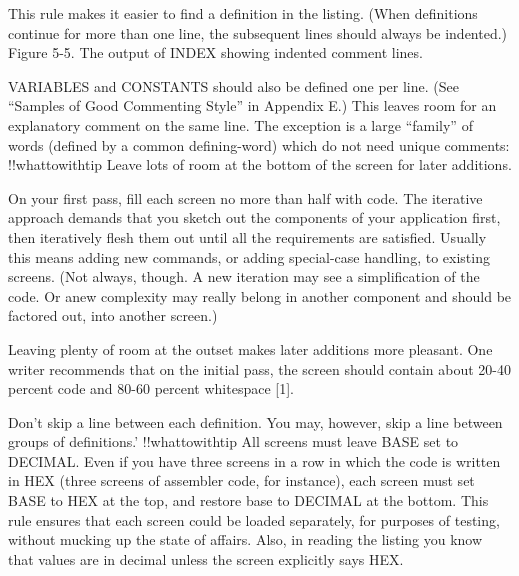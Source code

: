 This rule makes it easier to find a definition in the listing.  (When definitions
continue for more than one line, the subsequent lines should always
be indented.)
Figure 5-5. The output of INDEX showing indented comment lines.

VARIABLES and CONSTANTS should also be defined one per
line.  (See ``Samples of Good Commenting Style'' in Appendix E.) This
leaves room for an explanatory comment on the same line.  The exception
is a large ``family'' of words (defined by a common defining-word) which
do not need unique comments:
!!whattowithtip{
Leave lots of room at the bottom of the screen for later additions.
}

On your first pass, fill each screen no more than half with code.  The
iterative approach demands that you sketch out the components of your
application first, then iteratively flesh them out until all the requirements
are satisfied.  Usually this means adding new commands, or
adding special-case handling, to existing screens.  (Not always, though.  A
new iteration may see a simplification of the code.  Or anew complexity
may really belong in another component and should be factored out, into
another screen.)

Leaving plenty of room at the outset makes later additions more
pleasant.  One writer recommends that on the initial pass, the screen
should contain about 20-40 percent code and 80-60 percent whitespace [1].

Don't skip a line between each definition.  You may, however, skip a
line between groups of definitions.'
!!whattowithtip{
All screens must leave BASE set to DECIMAL.
}
Even if you have three screens in a row in which the code is written in
HEX (three screens of assembler code, for instance), each screen must set
BASE to HEX at the top, and restore base to DECIMAL at the bottom.
This rule ensures that each screen could be loaded separately, for purposes
of testing, without mucking up the state of affairs.  Also, in reading
the listing you know that values are in decimal unless the screen explicitly
says HEX.

